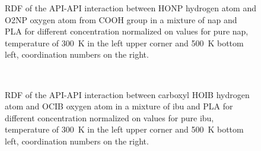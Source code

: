 \begin{figure}[H]
	\vspace{-0.3cm}
	\caption{RDF of the API-API interaction between HONP hydrogen atom and O2NP oxygen atom from COOH group in a mixture of nap and PLA for different concentration normalized on values for pure nap, temperature of 300~K in the left upper corner and 500~K bottom left, coordination numbers on the right.}
	\label{fig:nap_RDF_}
\end{figure}

\begin{figure}[H]
	\centering
	 \\
	\vspace{-0.3cm}
	\caption{RDF of the API-API interaction between carboxyl HOIB hydrogen atom and OCIB oxygen atom in a mixture of ibu and PLA for different concentration normalized on values for pure ibu, temperature of 300~K in the left upper corner and 500~K bottom left, coordination numbers on the right.}
	\label{fig:ibu_s_RDF_}
\end{figure}

